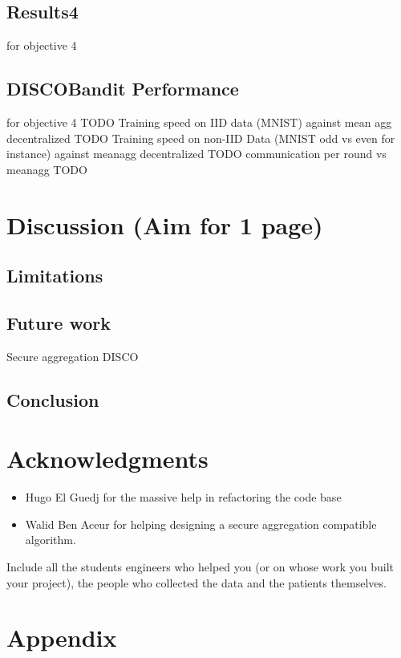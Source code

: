 \documentclass{article}
\begin{document}
        \subsection{Results4} for objective 4 
        \label{sec:results4}
        \subsection{DISCOBandit Performance} for objective 4
        TODO Training speed on IID data (MNIST) against mean agg decentralized
        TODO Training speed on non-IID Data (MNIST odd vs even for instance) against meanagg decentralized 
        TODO communication per round vs meanagg
        TODO 




    \newpage




\section{Discussion (Aim for 1 page)}
\label{sec:discussion}
    \subsection{Limitations}
    
    \subsection{Future work}
    Secure aggregation DISCO
    
    \subsection{Conclusion}

    \newpage
    
    
\section*{Acknowledgments}
\begin{itemize}
    \item Hugo El Guedj for the massive help in refactoring the code base
    \item Walid Ben Aceur for helping designing a secure aggregation compatible algorithm.
    

\end{itemize}
Include all the students engineers who helped you (or on whose work you built your project), the people who collected the data and the patients themselves.

  
  

\section*{Appendix}
\end{document}
